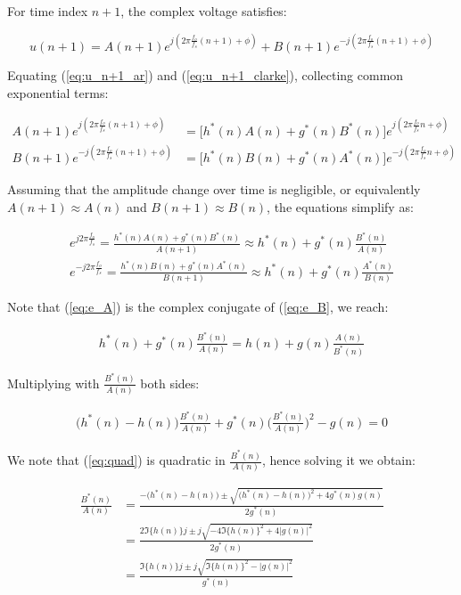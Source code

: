 \begin{enumerate}[label=\alph*), leftmargin=*]
For time index $n+1$, the complex voltage satisfies:

\begin{equation}
    u(n+1) = A(n+1) e^{j(2\pi \frac{f_{o}}{f_{s}} (n+1) + \phi)} + B(n+1) e^{-j(2\pi \frac{f_{o}}{f_{s}} (n+1) + \phi)}
\label{eq:u_n+1_clarke}
\end{equation}

Equating (\ref{eq:u_n+1_ar}) and (\ref{eq:u_n+1_clarke}), collecting common exponential terms:

\begin{align}
    A(n+1) e^{j(2\pi \frac{f_{o}}{f_{s}} (n+1) + \phi)} &= \bigg[ h^{*}(n) A(n) + g^{*}(n) B^{*}(n) \bigg] e^{j(2\pi \frac{f_{o}}{f_{s}} n + \phi)} \\
    B(n+1) e^{-j(2\pi \frac{f_{o}}{f_{s}} (n+1) + \phi)} &= \bigg[ h^{*}(n) B(n) + g^{*}(n) A^{*}(n) \bigg] e^{-j(2\pi \frac{f_{o}}{f_{s}} n + \phi)}
\end{align}

Assuming that the amplitude change over time is negligible, or equivalently $A(n+1) \approx A(n)$ and $B(n+1) \approx B(n)$, the equations simplify as:

\begin{align}
    e^{j 2\pi \frac{f_{o}}{f_{s}}} = \frac{h^{*}(n) A(n) + g^{*}(n) B^{*}(n)}{A(n+1)} \approx h^{*}(n) + g^{*}(n) \frac{B^{*}(n)}{A(n)} \label{eq:e_A}\\
    e^{-j 2\pi \frac{f_{o}}{f_{s}}} = \frac{h^{*}(n) B(n) + g^{*}(n) A^{*}(n)}{B(n+1)} \approx h^{*}(n) + g^{*}(n) \frac{A^{*}(n)}{B(n)} \label{eq:e_B}
\end{align}

Note that (\ref{eq:e_A}) is the complex conjugate of (\ref{eq:e_B}, we reach:


\begin{align}
    h^{*}(n) + g^{*}(n) \frac{B^{*}(n)}{A(n)} = h(n) + g(n) \frac{A(n)}{B^{*}(n)}
\end{align}

Multiplying with $\frac{B^{*}(n)}{A(n)}$ both sides:

\begin{align}
    \bigg( h^{*}(n) - h(n) \bigg) \frac{B^{*}(n)}{A(n)} + g^{*}(n) \bigg( \frac{B^{*}(n)}{A(n)} \bigg)^{2} - g(n) = 0
\label{eq:quad}
\end{align}

We note that (\ref{eq:quad}) is quadratic in $\frac{B^{*}(n)}{A(n)}$, hence solving it we obtain:

\begin{align}
    \frac{B^{*}(n)}{A(n)}   &= \frac{- \bigg( h^{*}(n) - h(n) \bigg) \pm \sqrt{\bigg( h^{*}(n) - h(n) \bigg)^{2} + 4 g^{*}(n) g(n)}}{2g^{*}(n)} \\
                            &= \frac{2 \Im\{h(n)\}j \pm j\sqrt{-4 \Im\{h(n)\}^{2} + 4 |g(n)|^{2}}}{2g^{*}(n)} \\
                            &= \frac{\Im\{h(n)\}j \pm j\sqrt{\Im\{h(n)\}^{2} - |g(n)|^{2}}}{g^{*}(n)}
\end{align}


\end{enumerate}
